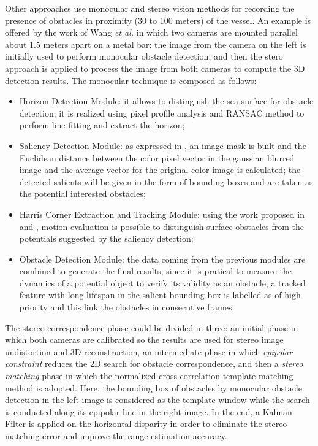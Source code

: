 \documentclass[journal]{IEEEtran}
\begin{document}
      \indent Other approaches use monocular and stereo vision methods for recording the presence of obstacles in proximity (30 to 100 meters) of the vessel. An example is offered by the work of Wang \textit{et al.} \cite{Wang2011,Wang2012} in which two cameras are mounted parallel about 1.5 meters apart on a metal bar: the image from the camera on the left is initially used to perform monocular obstacle detection, and then the stero approach is applied to process the image from both cameras to compute the 3D detection results. The monocular technique is composed as follows:
            \begin{itemize}
                  \item Horizon Detection Module: it allows to distinguish the sea surface for obstacle detection; it is realized using pixel profile analysis and RANSAC method to perform line fitting and extract the horizon;
                  \item Saliency Detection Module: as expressed in \cite{Achanta2009}, an image mask is built and the Euclidean distance between the color pixel vector in the gaussian blurred image and the average vector for the original color image is calculated; the detected salients will be given in the form of bounding boxes and are taken as the potential interested obstacles;
                  \item Harris Corner Extraction and Tracking Module: using the work proposed in \cite{Harris1988} and \cite{Bouguet1999}, motion evaluation is possible to distinguish surface obstacles from the potentials suggested by the saliency detection;
                  \item Obstacle Detection Module: the data coming from the previous modules are combined to generate the final results; since it is pratical to measure the dynamics of a potential object to verify its validity as an obstacle, a tracked feature with long lifespan in the salient bounding box is labelled as of high priority and this link the obstacles in consecutive frames.
            \end{itemize}
      \indent The stereo correspondence phase could be divided in three: an initial phase in which both cameras are calibrated so the results are used for stereo image undistortion and 3D reconstruction, an intermediate phase in which \textit{epipolar constraint} reduces the 2D search for obstacle correspondence, and then a \textit{stereo matching} phase in which the normalized cross correlation template matching method is adopted. Here, the bounding box of obstacles by monocular obstacle detection in the left image is considered as the template window while the search is conducted along its epipolar line in the right image. In the end, a Kalman Filter is applied on the horizontal disparity in order to eliminate the stereo matching error and improve the range estimation accuracy.\\
\end{document}
